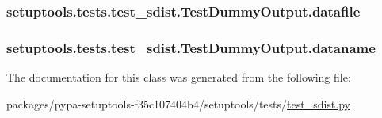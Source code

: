 \subsubsection[{datafile}]{\setlength{\rightskip}{0pt plus 5cm}setuptools.\+tests.\+test\+\_\+sdist.\+Test\+Dummy\+Output.\+datafile}\label{classsetuptools_1_1tests_1_1test__sdist_1_1TestDummyOutput_a41283a5ebdfa69fb6b7cf9bb372cde86}
\hypertarget{classsetuptools_1_1tests_1_1test__sdist_1_1TestDummyOutput_af853e35b83f3c416afba102a1276b582}{}
\subsubsection[{dataname}]{\setlength{\rightskip}{0pt plus 5cm}setuptools.\+tests.\+test\+\_\+sdist.\+Test\+Dummy\+Output.\+dataname}\label{classsetuptools_1_1tests_1_1test__sdist_1_1TestDummyOutput_af853e35b83f3c416afba102a1276b582}


The documentation for this class was generated from the following file\+:\begin{DoxyCompactItemize}
\item 
packages/pypa-\/setuptools-\/f35c107404b4/setuptools/tests/\hyperlink{test__sdist_8py}{test\+\_\+sdist.\+py}\end{DoxyCompactItemize}
